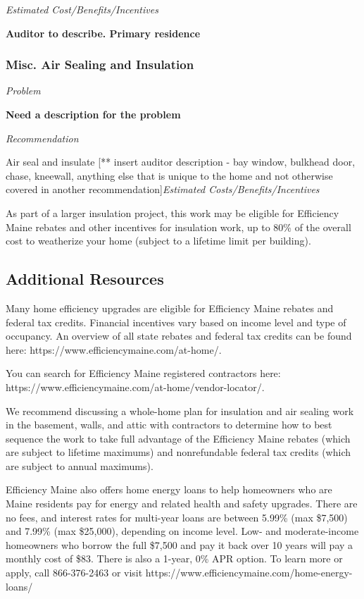 \documentclass[
  letterpaper,
  DIV=11,
  numbers=noendperiod]{scrartcl}
\begin{document}
\emph{Estimated Cost/Benefits/Incentives}

\textbf{Auditor to describe. Primary residence}

\subsubsection{Misc. Air Sealing and
Insulation}\label{misc.-air-sealing-and-insulation}

\emph{Problem}

\textbf{Need a description for the problem}

\emph{Recommendation}

Air seal and insulate {[}** insert auditor description - bay window,
bulkhead door, chase, kneewall, anything else that is unique to the home
and not otherwise covered in another recommendation{]}\emph{Estimated
Costs/Benefits/Incentives}

As part of a larger insulation project, this work may be eligible for
Efficiency Maine rebates and other incentives for insulation work, up to
80\% of the overall cost to weatherize your home (subject to a lifetime
limit per building).

\newpage{}

\subsection{Additional Resources}\label{additional-resources}

Many home efficiency upgrades are eligible for Efficiency Maine rebates
and federal tax credits. Financial incentives vary based on income level
and type of occupancy. An overview of all state rebates and federal tax
credits can be found here: https://www.efficiencymaine.com/at-home/.

You can search for Efficiency Maine registered contractors here:
https://www.efficiencymaine.com/at-home/vendor-locator/.

We recommend discussing a whole-home plan for insulation and air sealing
work in the basement, walls, and attic with contractors to determine how
to best sequence the work to take full advantage of the Efficiency Maine
rebates (which are subject to lifetime maximums) and nonrefundable
federal tax credits (which are subject to annual maximums).

Efficiency Maine also offers home energy loans to help homeowners who
are Maine residents pay for energy and related health and safety
upgrades. There are no fees, and interest rates for multi-year loans are
between 5.99\% (max \$7,500) and 7.99\% (max \$25,000), depending on
income level. Low- and moderate-income homeowners who borrow the full
\$7,500 and pay it back over 10 years will pay a monthly cost of \$83.
There is also a 1-year, 0\% APR option. To learn more or apply, call
866-376-2463 or visit https://www.efficiencymaine.com/home-energy-loans/
\end{document}
